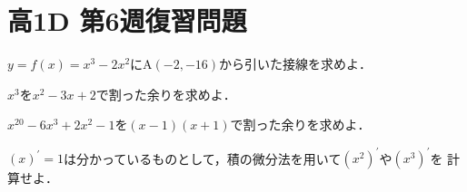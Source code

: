 \documentclass[b5paper, uplatex]{jsarticle}
\begin{document}
\section*{高1D 第6週復習問題}
\begin{enumarabicp}
  \item $y=f(x)=x^3-2x^2$にA$(-2,-16)$から引いた接線を求めよ．
  \item $x^3$を$x^2-3x+2$で割った余りを求めよ．
  \item $x^{20}-6x^3+2x^2-1$を$(x-1)(x+1)$で割った余りを求めよ．
  \item $(x)^\prime=1$は分かっているものとして，積の微分法を用いて$(x^2)^\prime$や$(x^3)^\prime$を
  計算せよ．
\end{enumarabicp}
\end{document}
